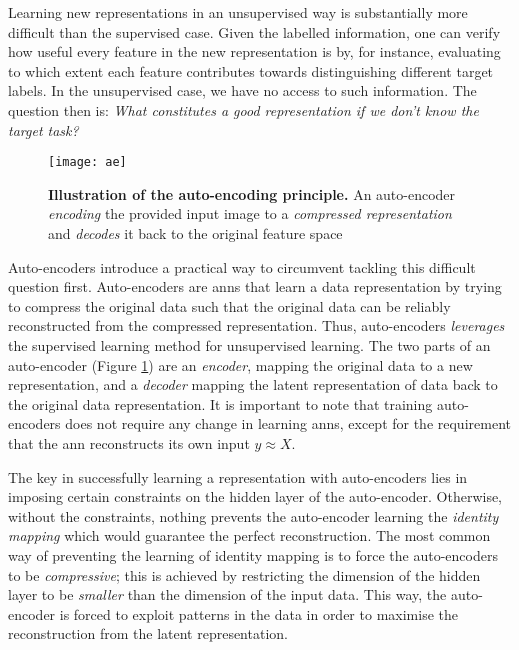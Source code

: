 Learning new representations in an unsupervised way is substantially more difficult than the supervised case.
Given the labelled information, one can verify how useful every feature in the new representation is  by, for instance, evaluating to which extent each feature contributes towards distinguishing different target labels.
In the unsupervised case, we have no access to such information.
The question then is: \textit{What constitutes a good representation if we don't know the target task?}


\begin{figure}
	\centering
	\texttt{[image: ae]}
	\caption[Illustration of the auto-encoding principle]{\textbf{Illustration of the auto-encoding principle.} An auto-encoder \textit{encoding} the provided input image to a \textit{compressed representation} and \textit{decodes} it back to the original feature space}
	\label{fig:ae}
\end{figure}



Auto-encoders introduce a practical way to circumvent tackling this difficult question first.
Auto-encoders are \gls{ann}s that learn a data representation by trying to compress the original data such that the original data can be reliably reconstructed from the compressed representation.
Thus, auto-encoders \textit{leverages} the supervised learning method for unsupervised learning.
The two parts of an auto-encoder (Figure \ref{fig:ae}) are an \textit{encoder}, mapping the original data to a new representation, and a \textit{decoder} mapping the latent representation of data back to the original data representation.
It is important to note that training auto-encoders does not require any change in learning \gls{ann}s, except for the requirement that the \gls{ann} reconstructs its own input $y \approx X$.




The key in successfully learning a representation with auto-encoders lies in imposing certain constraints on the hidden layer of the auto-encoder.
Otherwise, without the constraints, nothing prevents the auto-encoder learning the \textit{identity mapping} which would guarantee the perfect reconstruction.
The most common way of preventing the learning of identity mapping is to force the auto-encoders to be \textit{compressive}; this is achieved by restricting the dimension of the hidden layer to be \textit{smaller} than the dimension of the input data.
This way, the auto-encoder is forced to exploit patterns in the data in order to maximise the reconstruction from the latent representation.







